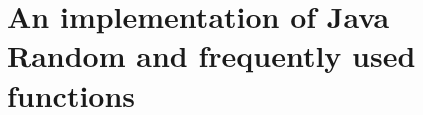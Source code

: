 \documentclass{article}
\begin{document}




\appendix

\section{An implementation of Java Random and frequently used functions}\label{appendix.jrand}
\end{document}
